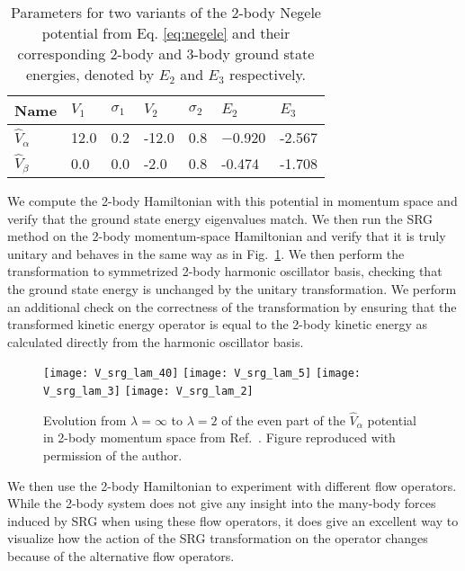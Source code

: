 \begin{table}[t]
\begin{center}
\begin{tabularx}{\textwidth}{ X X X X X X X } 
 \hline
 Name & $V_1$ & $\sigma_1$ & $V_2$ & $\sigma_2$ & $E_2$ & $E_3$ \\ 
 \hline
 $\hat{V}_\alpha$ & 12.0 & 0.2 & -12.0 & 0.8 & −0.920 & -2.567\\ 
 $\hat{V}_\beta$ & 0.0 & 0.0 & -2.0 & 0.8 & -0.474 & -1.708 \\ 
 \hline
\end{tabularx}
\end{center}
\caption{Parameters for two variants of the 2-body Negele potential from Eq. \ref{eq:negele} and their corresponding 2-body and 3-body ground state energies, denoted by $E_2$ and $E_3$ respectively.}
\label{table:negele_params}
\end{table}

We compute the 2-body Hamiltonian with this potential in momentum space and verify that the ground state energy eigenvalues match. We then run the SRG method on the 2-body momentum-space Hamiltonian and verify that it is truly unitary and behaves in the same way as in Fig.~\ref{fig:jurg_2body_ev}. We then perform the transformation to symmetrized 2-body harmonic oscillator basis, checking that the ground state energy is unchanged by the unitary transformation. We perform an additional check on the correctness of the transformation by ensuring that the transformed kinetic energy operator is equal to the 2-body kinetic energy as calculated directly from the harmonic oscillator basis.

\begin{figure}[t]
\begin{center}
 \texttt{[image: V\_srg\_lam\_40]}
\texttt{[image: V\_srg\_lam\_5]}
 \texttt{[image: V\_srg\_lam\_3]}
 \texttt{[image: V\_srg\_lam\_2]}
\end{center}
\caption{Evolution from $\lambda=\infty$ to $\lambda=2$ of the even part of the $\hat{V}_\alpha$ potential in 2-body momentum space from Ref.~\cite{Jurgenson:2008jp}. Figure reproduced with permission of the author.}
\label{fig:jurg_2body_ev}
\end{figure}

We then use the 2-body Hamiltonian to experiment with different flow operators. While the 2-body system does not give any insight into the many-body forces induced by SRG when using these flow operators, it does give an excellent way to visualize how the action of the SRG transformation on the operator changes because of the alternative flow operators.

